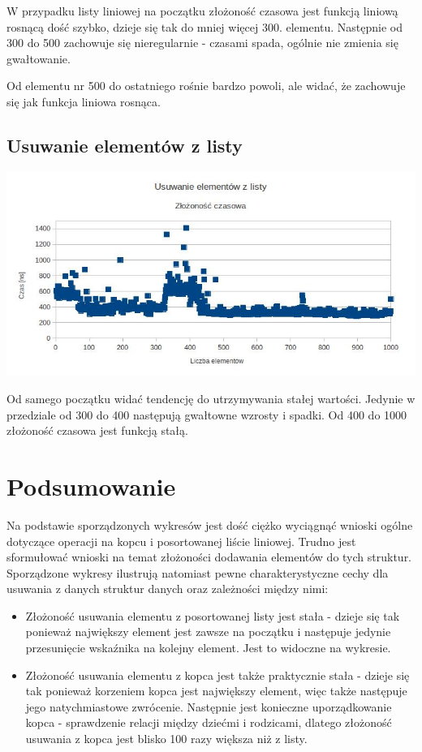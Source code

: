 \documentclass[10pt,a4paper]{article}
\begin{document}
W przypadku listy liniowej na początku złożoność czasowa jest funkcją liniową rosnącą dość szybko, dzieje się tak do mniej więcej
300. elementu. Następnie od 300 do 500 zachowuje się nieregularnie - czasami spada, ogólnie nie zmienia się gwałtowanie.

Od elementu nr 500 do ostatniego rośnie bardzo powoli, ale widać, że zachowuje się jak funkcja liniowa rosnąca.

\subsection{Usuwanie elementów z listy}

\includegraphics[scale=0.4]{list_removing.jpg}

Od samego początku widać tendencję do utrzymywania stałej wartości. Jedynie w przedziale od 300 do 400 następują gwałtowne
wzrosty i spadki. Od 400 do 1000 złożoność czasowa jest funkcją stałą. 

\section{Podsumowanie}

Na podstawie sporządzonych wykresów jest dość ciężko wyciągnąć wnioski ogólne dotyczące operacji na kopcu i posortowanej liście liniowej.
Trudno jest sformułować wnioski na temat złożoności dodawania elementów do tych struktur. Sporządzone wykresy ilustrują 
natomiast pewne charakterystyczne cechy dla usuwania z danych struktur danych oraz zależności między nimi:

\begin{itemize}
\item Złożoność usuwania elementu z posortowanej listy jest stała - dzieje się tak ponieważ największy element jest zawsze na 
początku i następuje jedynie przesunięcie wskaźnika na kolejny element. Jest to widoczne na wykresie.

\item Złożoność usuwania elementu z kopca jest także praktycznie stała - dzieje się tak ponieważ korzeniem kopca jest największy
element, więc także następuje jego natychmiastowe zwrócenie. Następnie jest konieczne uporządkowanie kopca - sprawdzenie relacji
między dziećmi i rodzicami, dlatego złożoność usuwania z kopca jest blisko 100 razy większa niż z listy.
\end{itemize} 
\end{document}
